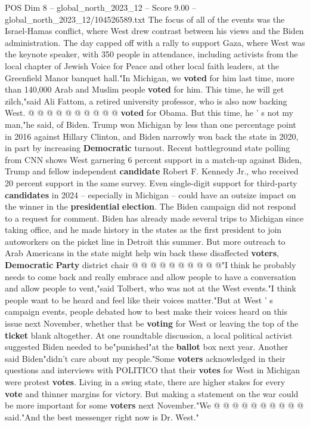 \begin{textsample}{POS Dim 8 – global\_north\_2023\_12 – Score 9.00 – global\_north\_2023\_12/104526589.txt}
The focus of all of the events was the Israel-Hamas conflict, where West drew contrast between his views and the Biden administration.
The day capped off with a rally to support Gaza, where West was the keynote speaker, with 350 people in attendance, including activists from the local chapter of Jewish Voice for Peace and other local faith leaders, at the Greenfield Manor banquet hall."In Michigan, we \textbf{voted} for him last time, more than 140,000 Arab and Muslim people \textbf{voted} for him.
This time, he will get zilch,"said Ali Fattom, a retired university professor, who is also now backing West. @ @ @ @ @ @ @ @ @ @ \textbf{voted} for Obama.
But this time, he ' s not my man,"he said, of Biden.
Trump won Michigan by less than one percentage point in 2016 against Hillary Clinton, and Biden narrowly won back the state in 2020, in part by increasing \textbf{Democratic} turnout.
Recent battleground state polling from CNN shows West garnering 6 percent support in a match-up against Biden, Trump and fellow independent \textbf{candidate} Robert F.
Kennedy Jr., who received 20 percent support in the same survey.
Even single-digit support for third-party \textbf{candidates} in 2024 -- especially in Michigan -- could have an outsize impact on the winner in the \textbf{presidential} \textbf{election}.
The Biden campaign did not respond to a request for comment.
Biden has already made several trips to Michigan since taking office, and he made history in the states as the first president to join autoworkers on the picket line in Detroit this summer.
But more outreach to Arab Americans in the state might help win back these disaffected \textbf{voters}, \textbf{Democratic} \textbf{Party} district chair @ @ @ @ @ @ @ @ @ @"I think he probably needs to come back and really embrace and allow people to have a conversation and allow people to vent,"said Tolbert, who was not at the West events."I think people want to be heard and feel like their voices matter."But at West ' s campaign events, people debated how to best make their voices heard on this issue next November, whether that be \textbf{voting} for West or leaving the top of the \textbf{ticket} blank altogether.
At one roundtable discussion, a local political activist suggested Biden needed to be"punished"at the \textbf{ballot} box next year.
Another said Biden"didn't care about my people."Some \textbf{voters} acknowledged in their questions and interviews with POLITICO that their \textbf{votes} for West in Michigan were protest \textbf{votes}.
Living in a swing state, there are higher stakes for every \textbf{vote} and thinner margins for victory.
But making a statement on the war could be more important for some \textbf{voters} next November."We @ @ @ @ @ @ @ @ @ @ said."And the best messenger right now is Dr.
West."

\end{textsample}
